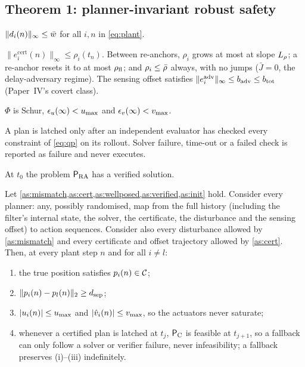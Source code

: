 \subsection{Theorem 1: planner-invariant robust safety}\label{sec:thm1}
\begin{assumption}\label{as:mismatch}
$\|d_i(n)\|_\infty\le\bar w$ for all $i,n$ in \eqref{eq:plant}.
\end{assumption}
\begin{assumption}\label{as:cert}
$\|e^{\mathrm{cert}}_i(n)\|_\infty\le\rho_i(t_n)$. Between re-anchors,
$\rho_i$ grows at most at slope $L_{\rho}$; a re-anchor resets it to at most
$\rho_{\mathrm{fl}}$; and $\rho_i\le\bar\rho$ always, with no jumps ($\bar J=0$, the
delay-adversary regime). The sensing offset satisfies
$\|e^{\mathrm{adv}}_i\|_\infty\le b_{\mathrm{adv}}\le b_{\mathrm{tot}}$ (Paper~IV's covert class).
\end{assumption}
\begin{assumption}\label{as:wellposed}
$\Phi$ is Schur, $\epsilon_u(\infty)<u_{\max}$ and $\epsilon_v(\infty)<v_{\max}$.
\end{assumption}
\begin{assumption}\label{as:verified}
A plan is latched only after an independent evaluator has checked every
constraint of \eqref{eq:qp} on its rollout. Solver failure, time-out or a
failed check is reported as failure and never executes.
\end{assumption}
\begin{assumption}\label{as:init}
At $t_0$ the problem $\mathsf{P}_{\mathrm{RA}}$ has a verified solution.
\end{assumption}

\begin{theorem}\label{thm:safety}
Let \cref{as:mismatch,as:cert,as:wellposed,as:verified,as:init} hold.
Consider every planner: any, possibly randomised, map from the full history
(including the filter's internal state, the solver, the certificate, the
disturbance and the sensing offset) to action sequences. Consider also every
disturbance allowed by \cref{as:mismatch} and every certificate and offset
trajectory allowed by \cref{as:cert}. Then, at every plant step $n$ and for
all $i\neq l$:
\begin{enumerate}[label=(\roman*)]
\item the true position satisfies $p_i(n)\in\mathcal{C}$;
\item $\|p_i(n)-p_l(n)\|_2\ge d_{\mathrm{sep}}$;
\item $|u_i(n)|\le u_{\max}$ and $|\hat v_i(n)|\le v_{\max}$, so the actuators never saturate;
\item whenever a certified plan is latched at $t_j$, $\mathsf{P}_{\mathrm{C}}$ is feasible at
  $t_{j+1}$, so a fallback can only follow a solver or verifier failure, never
  infeasibility; a fallback preserves (i)--(iii) indefinitely.
\end{enumerate}
\end{theorem}

